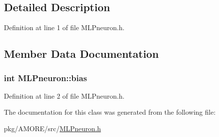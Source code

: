 \subsection{Detailed Description}


Definition at line 1 of file MLPneuron.h.



\subsection{Member Data Documentation}
\hypertarget{class_m_l_pneuron_a6f8cb5b2fbf48db003ea8a413ffdbd8b}{
\subsubsection[{bias}]{\setlength{\rightskip}{0pt plus 5cm}int {\bf MLPneuron::bias}}}
\label{class_m_l_pneuron_a6f8cb5b2fbf48db003ea8a413ffdbd8b}


Definition at line 2 of file MLPneuron.h.



The documentation for this class was generated from the following file:\begin{DoxyCompactItemize}
\item 
pkg/AMORE/src/\hyperlink{_m_l_pneuron_8h}{MLPneuron.h}\end{DoxyCompactItemize}
